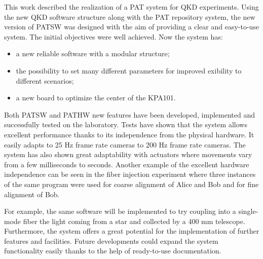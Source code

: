 This work described the realization of a PAT system for QKD experiments. Using the new QKD software structure along with the PAT repository system, the new version of PATSW was designed with the aim of providing a clear and easy-to-use system. The initial objectives were well achieved. Now the system has:
\begin{itemize}
  \item a new reliable software with a modular structure;
  \item the possibility to set many different parameters for improved exibility to different scenarios;
  \item a new board to optimize the center of the KPA101.
\end{itemize}
Both PATSW and PATHW new features have been developed, implemented and
successfully tested on the laboratory. Tests have shown that the system allows excellent performance thanks to its independence from the physical hardware. It easily adapts to 25 Hz frame rate cameras to 200 Hz frame rate cameras. The system has also shown great adaptability with actuators where movements vary from a few milliseconds to seconds. Another example of the excellent hardware independence can be seen in the fiber injection experiment where three instances of the same program were used for coarse alignment of Alice and Bob and for fine alignment of Bob.

For example, the same software will be implemented to try coupling into a single-mode fiber the light coming from a star and collected by a 400 mm telescope.
Furthermore, the system offers a great potential for the implementation of further
features and facilities. Future developments could expand the system functionality easily thanks to the help of ready-to-use documentation.